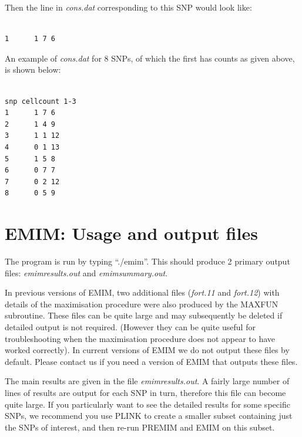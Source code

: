 \documentclass[a4paper,12pt]{article}
\begin{document}
Then the line in {\it cons.dat} corresponding to this SNP would look like: 
\vspace{0.35cm} \begin{lstlisting}

1      1 7 6

\end{lstlisting} \vspace{0.35cm}
An example of {\it cons.dat} for 8 SNPs, of which the first has counts as given above, is shown below: 
\vspace{0.35cm} \begin{lstlisting}

snp cellcount 1-3
1      1 7 6
2      1 4 9
3      1 1 12
4      0 1 13
5      1 5 8
6      0 7 7
7      0 2 12
8      0 5 9

\end{lstlisting} \vspace{0.35cm}



\section{EMIM: Usage and output files}
\label{output}

The program is run by typing ``./emim''. This should produce 2 primary output files: {\it emimresults.out} and {\it emimsummary.out}. 

In previous versions of EMIM, two additional files ({\it fort.11} and {\it fort.12}) with details of the maximisation procedure were also produced by the MAXFUN subroutine. These files can be quite large and may subsequently be deleted if detailed output is not required. (However they can be quite useful for troubleshooting when the maximisation procedure does not appear to have worked correctly). In current versions of EMIM we do not output these files by default. Please contact us if you need a version of EMIM that outputs these files. 

The main results are given in the file {\it emimresults.out}. A fairly large number of lines of results are output for each SNP in turn, therefore this file can become quite large. If you particularly want to see the detailed results for some specific SNPs, we recommend you use PLINK to create a smaller subset containing just the SNPs of interest, and then re-run PREMIM and EMIM on this subset. 
\end{document}
